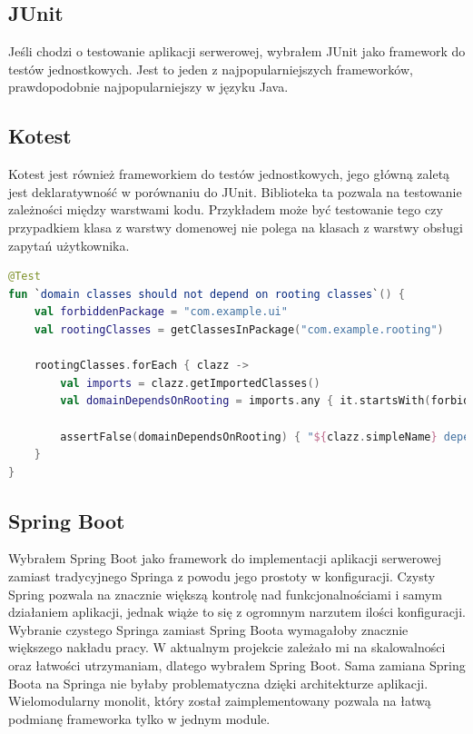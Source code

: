\subsection{JUnit}\label{subsec:uzyte-technologie-junit}
Jeśli chodzi o testowanie aplikacji serwerowej, wybrałem JUnit jako framework do testów jednostkowych.
Jest to jeden z najpopularniejszych frameworków, prawdopodobnie najpopularniejszy w języku Java.

\subsection{Kotest}\label{subsec:uzyte-technologie-kotest}
Kotest jest również frameworkiem do testów jednostkowych, jego główną zaletą jest deklaratywność w porównaniu do JUnit.
Biblioteka ta pozwala na testowanie zależności między warstwami kodu.
Przykładem może być testowanie tego czy przypadkiem klasa z warstwy domenowej nie polega na klasach z warstwy obsługi zapytań użytkownika.
\begin{lstlisting}[caption=Przykład testu w Kotest, language=Kotlin]
@Test
fun `domain classes should not depend on rooting classes`() {
    val forbiddenPackage = "com.example.ui"
    val rootingClasses = getClassesInPackage("com.example.rooting")

    rootingClasses.forEach { clazz ->
        val imports = clazz.getImportedClasses()
        val domainDependsOnRooting = imports.any { it.startsWith(forbiddenPackage) }

        assertFalse(domainDependsOnRooting) { "${clazz.simpleName} depends on UI classes" }
    }
}
\end{lstlisting}

\subsection{Spring Boot}\label{subsec:uzyte-technologie-spring-boot}
Wybrałem Spring Boot jako framework do implementacji aplikacji serwerowej zamiast tradycyjnego Springa z powodu jego prostoty w konfiguracji.
Czysty Spring pozwala na znacznie większą kontrolę nad funkcjonalnościami i samym działaniem aplikacji, jednak wiąże to się z ogromnym narzutem ilości konfiguracji.
Wybranie czystego Springa zamiast Spring Boota wymagałoby znacznie większego nakładu pracy.
W aktualnym projekcie zależało mi na skalowalności oraz łatwości utrzymaniam, dlatego wybrałem Spring Boot.
Sama zamiana Spring Boota na Springa nie byłaby problematyczna dzięki architekturze aplikacji.
Wielomodularny monolit, który został zaimplementowany pozwala na łatwą podmianę frameworka tylko w jednym module.

